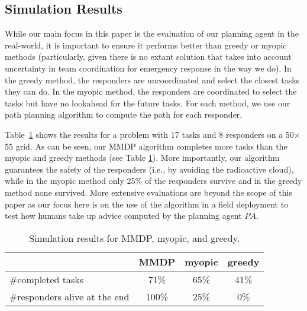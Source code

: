 \subsection{Simulation Results}
While our main focus in this paper is the evaluation of our planning agent in the real-world, it is important  to ensure it
performs better than  greedy or myopic methods (particularly, given there is no extant solution that takes into account
uncertainty in team coordination for emergency response in the way we do).  In
the greedy method, the responders are uncoordinated and select the
closest tasks they can do. In the myopic method, the responders are
coordinated to select the tasks but have no lookahead for the
future tasks. For each method, we use our
path planning algorithm to compute the path for each responder.

Table~\ref{tab:simulation} shows the results for a problem with 17
tasks and 8 responders on a 50$\times$55 grid. As can be seen, our
MMDP algorithm completes more tasks than the myopic and greedy
methods (see Table \ref{tab:simulation}). More importantly, our
algorithm guarantees the safety of the responders (i.e., by avoiding the radioactive cloud), while in the
myopic method  only 25\% of the responders survive and in the
greedy method none survived.
More extensive evaluations are beyond the scope of this paper as
our focus here is on the use of the algorithm in a field deployment
to test how humans take up advice computed by the planning agent
$PA$.\vspace{-2mm}
\begin{table}[htbp]
\begin{center}\small
  
  \begin{tabular}{l|c|c|c}
   & MMDP & myopic & greedy \\
  \hline
  \#completed tasks & 71\% & 65\% & 41\% \\
  \hline
  \#responders alive at the end & 100\% & 25\% & 0\% \\
  \end{tabular}
  \end{center}\caption{Simulation results for MMDP, myopic, and greedy.}
  \label{tab:simulation}\vspace{-4mm}
\end{table}
